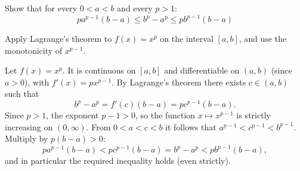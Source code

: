 
\begin{question}
Show that for every $0<a<b$ and every $p>1$:
\[ pa^{p-1}(b-a)\le b^p-a^p\le pb^{p-1}(b-a) \]
\end{question}

\begin{hint}
Apply Lagrange's theorem to $f(x)=x^p$ on the interval $[a,b]$, and use the monotonicity of $x^{p-1}$.
\end{hint}

\begin{solution}
Let $f(x)=x^p$. It is continuous on $[a,b]$ and differentiable on $(a,b)$ (since $a>0$), with $f'(x)=px^{p-1}$. By Lagrange's theorem there exists $c\in(a,b)$ such that
\[ b^p-a^p=f'(c)(b-a)=pc^{p-1}(b-a). \]
Since $p>1$, the exponent $p-1>0$, so the function $x\mapsto x^{p-1}$ is strictly increasing on $(0,\infty)$. From $0<a<c<b$ it follows that $a^{p-1}<c^{p-1}<b^{p-1}$. Multiply by $p(b-a)>0$:
\[ pa^{p-1}(b-a)<pc^{p-1}(b-a)=b^p-a^p<pb^{p-1}(b-a), \]
and in particular the required inequality holds (even strictly).
\end{solution}
